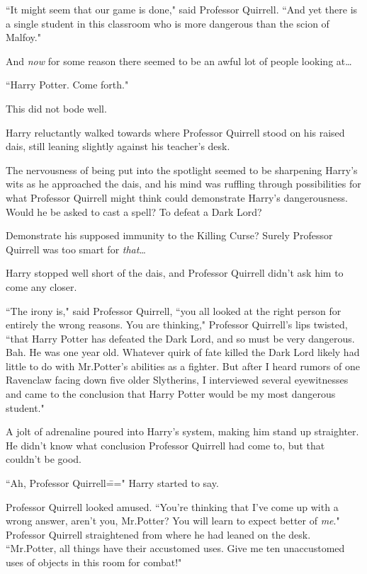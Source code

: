 ``It might seem that our game is done," said Professor Quirrell. ``And yet there is a single student in this classroom who is more dangerous than the scion of Malfoy."

And \emph{now} for some reason there seemed to be an awful lot of people looking at{\ldots}

``Harry Potter. Come forth."

This did not bode well.

Harry reluctantly walked towards where Professor Quirrell stood on his raised dais, still leaning slightly against his teacher's desk.

The nervousness of being put into the spotlight seemed to be sharpening Harry's wits as he approached the dais, and his mind was ruffling through possibilities for what Professor Quirrell might think could demonstrate Harry's dangerousness. Would he be asked to cast a spell? To defeat a Dark Lord?

Demonstrate his supposed immunity to the Killing Curse? Surely Professor Quirrell was too smart for \emph{that}{\ldots}

Harry stopped well short of the dais, and Professor Quirrell didn't ask him to come any closer.

``The irony is," said Professor Quirrell, ``you all looked at the right person for entirely the wrong reasons. You are thinking," Professor Quirrell's lips twisted, ``that Harry Potter has defeated the Dark Lord, and so must be very dangerous. Bah. He was one year old. Whatever quirk of fate killed the Dark Lord likely had little to do with Mr.\?Potter's abilities as a fighter. But after I heard rumors of one Ravenclaw facing down five older Slytherins, I interviewed several eyewitnesses and came to the conclusion that Harry Potter would be my most dangerous student."

A jolt of adrenaline poured into Harry's system, making him stand up straighter. He didn't know what conclusion Professor Quirrell had come to, but that couldn't be good.

``Ah, Professor Quirrell\===" Harry started to say.

Professor Quirrell looked amused. ``You're thinking that I've come up with a wrong answer, aren't you, Mr.\?Potter? You will learn to expect better of \emph{me}." Professor Quirrell straightened from where he had leaned on the desk. ``Mr.\?Potter, all things have their accustomed uses. Give me ten unaccustomed uses of objects in this room for combat!"

